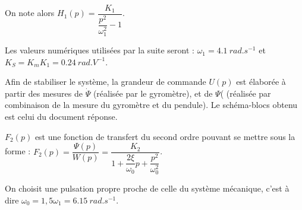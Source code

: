 \ifprof
\begin{corrige}
\end{corrige}
\else
\fi


On note alors $H_1(p)=\dfrac{K_1}{\dfrac{p^2}{\omega_1^2} - 1}$. 

Les valeurs numériques utilisées par la suite seront : $\omega_1=\SI{4,1}{rad.s^{-1}}$ et
$K_S = K_mK_1 = \SI{0,24}{rad.V^{-1}}$.

Afin de stabiliser le système, la grandeur de commande $U(p)$ est élaborée à partir des mesures de $\dot{\Psi}$ (réalisée par le gyromètre), et de ${\Psi}$( (réalisée par combinaison de la mesure du gyromètre et du pendule). Le schéma-blocs obtenu est celui du document réponse.


\ifprof
\begin{corrige}
\end{corrige}
\else
\fi



\ifprof
\begin{corrige}
\end{corrige}
\else
\fi

$F_2(p)$ est une fonction de transfert du second ordre pouvant se mettre sous la forme :
$F_2(p)=\dfrac{\Psi(p)}{W(p)}=\dfrac{K_2}{1+\dfrac{2\xi}{\omega_0}p+\dfrac{p^2}{\omega_0^2}}$.


\ifprof
\begin{corrige}
\end{corrige}
\else
\fi

On choisit une pulsation propre proche de celle du système mécanique, c’est
à dire $\omega_0 = 1,5\omega_1=\SI{6,15}{rad.s^{-1}}$.



\ifprof
\begin{corrige}
\end{corrige}
\else
\fi





